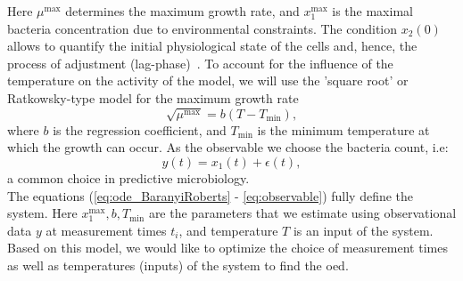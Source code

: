 \documentclass[graybox]{svmult}
\begin{document}
Here $\mu^\text{max}$ determines the maximum growth rate, and $x_1^\text{max}$ is the maximal bacteria concentration due to environmental constraints.
The condition $x_2(0)$ allows to quantify the initial physiological state of the cells and, hence, the process of adjustment (lag-phase)~\cite{grijspeerdt_estimating_1999}.
To account for the influence of the temperature on the activity of the model, we will use the 'square root' or Ratkowsky-type model for the maximum growth rate~\cite{ratkowsky_relationship_1982}
\begin{equation}
    \sqrt{\mu^\text{max}} = b (T - T_\text{min}),
    \label{eq:RatkowskyModel}
\end{equation}
where $b$ is the regression coefficient, and $T_\text{min}$ is the minimum temperature at which the growth can occur.
As the observable we choose the bacteria count, i.e:
\begin{equation}
    y(t) = x_1(t)+\epsilon(t),
    \label{eq:observable}
 \end{equation}
a common choice in predictive microbiology.\\
The equations (\ref{eq:ode_BaranyiRoberts} - \ref{eq:observable}) fully define the system.
Here $x_1^\text{max}, b, T_\text{min}$ are the parameters that we estimate using observational data $y$ at measurement times $t_i$, and temperature $T$ is an input of the system.
Based on this model, we would like to optimize the choice of measurement times as well as temperatures (inputs) of the system to find the \acl{oed}.
%
\end{document}

